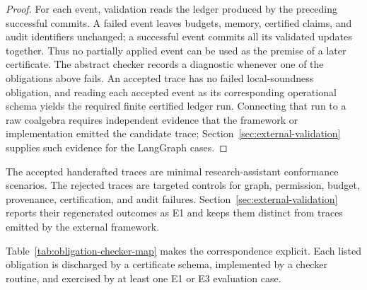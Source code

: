 \documentclass[a4paper,fleqn]{cas-sc}
\begin{document}
\begin{proof}
For each event, validation reads the ledger produced by the preceding
successful commits. A failed event leaves budgets, memory, certified claims,
and audit identifiers unchanged; a successful event commits all its validated
updates together. Thus no partially applied event can be used as the premise
of a later certificate. The abstract checker records a diagnostic whenever
one of the obligations above fails. An accepted trace has no failed
local-soundness obligation, and reading each accepted event as its
corresponding operational schema yields the required finite certified ledger
run. Connecting that run to a raw coalgebra requires independent evidence
that the framework or implementation emitted the candidate trace;
Section~\ref{sec:external-validation} supplies such evidence for the
LangGraph cases.
\end{proof}

The accepted handcrafted traces are minimal research-assistant conformance
scenarios. The rejected traces are targeted controls for graph, permission,
budget, provenance, certification, and audit failures. Section~\ref{sec:external-validation}
reports their regenerated outcomes as E1 and keeps them distinct from traces
emitted by the external framework.

Table~\ref{tab:obligation-checker-map} makes the correspondence explicit. Each listed obligation is discharged by a certificate schema, implemented by a checker routine, and exercised by at least one E1 or E3 evaluation case.
\end{document}
